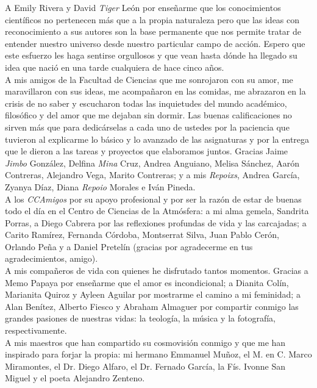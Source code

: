 A Emily Rivera y David \textit{Tiger} León por enseñarme que los conocimientos científicos no pertenecen más que a la propia naturaleza pero que las ideas con reconocimiento a sus autores son la base permanente que nos permite tratar de entender nuestro universo desde nuestro particular campo de acción. Espero que este esfuerzo les haga sentirse orgullosos y que vean hasta dónde ha llegado su idea que nació en una tarde cualquiera de hace cinco años.\\

A mis amigos de la Facultad de Ciencias que me sonrojaron con su amor, me maravillaron con sus ideas, me acompañaron en las comidas, me abrazaron en la crisis de no saber y escucharon todas las inquietudes del mundo académico, filosófico y del amor que me dejaban sin dormir. Las buenas calificaciones no sirven más que para dedicárselas a cada uno de ustedes por la paciencia que tuvieron al explicarme lo básico y lo avanzado de las asignaturas y por la entrega que le dieron a las tareas y proyectos que elaboramos juntos. Gracias Jaime \textit{Jimbo} González, Delfina \textit{Mina} Cruz, Andrea Anguiano, Melisa Sánchez, Aarón Contreras, Alejandro Vega, Marito Contreras; y a mis \textit{Repoixs}, Andrea García, Zyanya Díaz, Diana \textit{Repoio} Morales e Iván Pineda.\\

A los \textit{CCAmigos} por su apoyo profesional y por ser la razón de estar de buenas todo el día en el Centro de Ciencias de la Atmósfera: a mi alma gemela, Sandrita Porras, a Diego Cabrera por las reflexiones profundas de vida y las carcajadas; a Carito Ramírez, Fernanda Córdoba, Montserrat Silva, Juan Pablo Cerón, Orlando Peña y a Daniel Pretelín (gracias por agradecerme en tus agradecimientos, amigo).\\

A mis compañeros de vida con quienes he disfrutado tantos momentos. Gracias a Memo Papaya por enseñarme que el amor es incondicional; a Dianita Colín, Marianita Quiroz y Ayleen Aguilar por mostrarme el camino a mi feminidad; a Alan Benítez, Alberto Fiesco y Abraham Almaguer por compartir conmigo las grandes pasiones de nuestras vidas: la teología, la música y la fotografía, respectivamente.\\

A mis maestros que han compartido su cosmovisión conmigo y que me han inspirado para forjar la propia: mi hermano Emmanuel Muñoz, el M. en C. Marco Miramontes, el Dr. Diego Alfaro, el Dr. Fernado García, la Fís. Ivonne San Miguel y el poeta Alejandro Zenteno.\\

